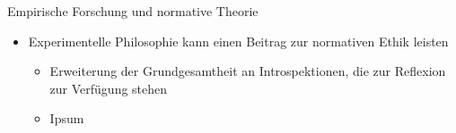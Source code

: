 \documentclass[xcolor=table,9pt,aspectratio=169]{beamer}
\begin{document}
\begin{frame}{\vspace*{10mm}Empirische Forschung und normative Theorie}
\begin{multicols}{2}
\begin{itemize}
   \item[(E3)] Experimentelle Philosophie kann einen Beitrag zur normativen Ethik leisten
   \begin{itemize}
      \item[(E3.1)] Erweiterung der Grundgesamtheit an Introspektionen, die zur Reflexion zur Verfügung stehen
      \item[(E3.2)] Ipsum
   \end{itemize}
\end{itemize}
\vfill

\begin{center}
   \vspace{1cm}
   \vspace{1cm}
\end{center}
\end{multicols}
\end{frame}
\end{document}
